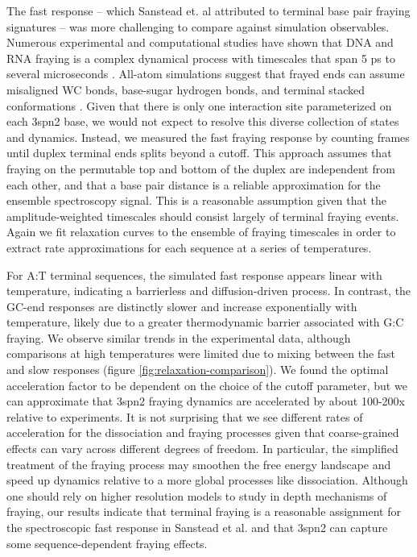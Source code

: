 \documentclass[journal=jpcbfk,manuscript=article]{achemso}
\begin{document}
The fast response -- which Sanstead et. al attributed to terminal base pair fraying signatures -- was more challenging to compare against simulation observables. Numerous experimental and computational studies have shown that DNA and RNA fraying is a complex dynamical process with timescales that span 5 ps to several microseconds \citep{ Nonin1995TerminalFraying, Nikolova2012ProbingSimulations, Andreatta2006UltrafastHelix, Galindo-Murillo2015ConvergenceDGCACGAACGAACGAACGC}. All-atom simulations suggest that frayed ends can assume misaligned WC bonds, base-sugar hydrogen bonds, and terminal stacked conformations \citep{PinamontiTheModels, Zgarbova2014BaseRNA}. Given that there is only one interaction site parameterized on each 3spn2 base, we would not expect to resolve this diverse collection of states and dynamics. Instead, we measured the fast fraying response by counting frames until duplex terminal ends splits beyond a cutoff. This approach assumes that fraying on the permutable top and bottom of the duplex are independent from each other, and that a base pair distance is a reliable approximation for the ensemble spectroscopy signal. This is a reasonable assumption given that the amplitude-weighted timescales should consist largely of terminal fraying events. Again we fit relaxation curves to the ensemble of fraying timescales in order to extract rate approximations for each sequence at a series of temperatures. 

For A:T terminal sequences, the simulated fast response appears linear with temperature, indicating a barrierless and diffusion-driven process. In contrast, the GC-end responses are distinctly slower and increase exponentially with temperature, likely due to a greater thermodynamic barrier associated with G:C fraying. We observe similar trends in the experimental data, although comparisons at high temperatures were limited due to mixing between the fast and slow responses (figure \ref{fig:relaxation-comparison}). We found the optimal acceleration factor to be dependent on the choice of the cutoff parameter, but we can approximate that 3spn2 fraying dynamics are accelerated by about 100-200x relative to experiments. It is not surprising that we see different rates of acceleration for the dissociation and fraying processes given that coarse-grained effects can vary across different degrees of freedom. In particular, the simplified treatment of the fraying process may smoothen the free energy landscape and speed up dynamics relative to a more global processes like dissociation. Although one should rely on higher resolution models to study in depth mechanisms of fraying, our results indicate that terminal fraying is a reasonable assignment for the spectroscopic fast response in Sanstead et al. and that 3spn2 can capture some sequence-dependent fraying effects.
\end{document}

